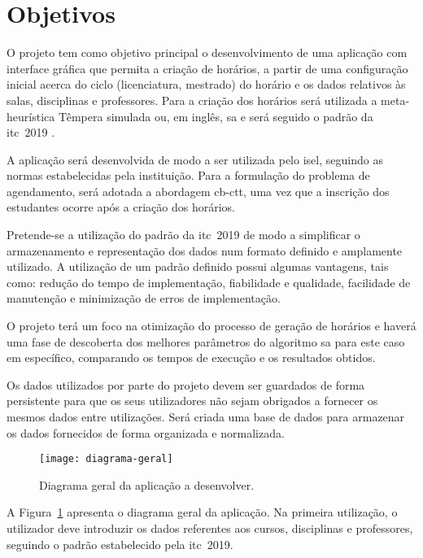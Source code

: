 \section{Objetivos}

O projeto tem como objetivo principal o desenvolvimento de uma aplicação com interface gráfica que permita a criação de horários, a partir de uma configuração inicial acerca do ciclo (licenciatura, mestrado) do horário e os dados relativos às salas, disciplinas e professores. Para a criação dos horários será utilizada a meta-heurística Têmpera simulada ou, em inglês, \gls{sa} e será seguido o padrão da \gls{itc}~2019 \cite{itc2019-Website}.

A aplicação será desenvolvida de modo a ser utilizada pelo \gls{isel}, seguindo as normas estabelecidas pela instituição. Para a formulação do problema de agendamento, será adotada a abordagem \gls{cb-ctt}, uma vez que a inscrição dos estudantes ocorre após a criação dos horários.

Pretende-se a utilização do padrão da \gls{itc}~2019 de modo a simplificar o armazenamento e representação dos dados num formato definido e amplamente utilizado. A utilização de um padrão definido possui algumas vantagens, tais como: redução do tempo de implementação, fiabilidade e qualidade, facilidade de manutenção e minimização de erros de implementação.

O projeto terá um foco na otimização do processo de geração de horários e haverá uma fase de descoberta dos melhores parâmetros do algoritmo \gls{sa} para este caso em específico, comparando os tempos de execução e os resultados obtidos.

Os dados utilizados por parte do projeto devem ser guardados de forma persistente para que os seus utilizadores não sejam obrigados a fornecer os mesmos dados entre utilizações. Será criada uma base de dados para armazenar os dados fornecidos de forma organizada e normalizada.

\begin{figure}[htbp]
    \centering
    \texttt{[image: diagrama-geral]}
    \caption{Diagrama geral da aplicação a desenvolver.}
    \label{fig:diagrama-geral}
\end{figure}

A Figura~\ref{fig:diagrama-geral} apresenta o diagrama geral da aplicação. Na primeira utilização, o utilizador deve introduzir os dados referentes aos cursos, disciplinas e professores, seguindo o padrão estabelecido pela \gls{itc}~2019.


